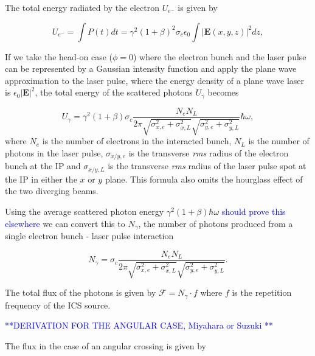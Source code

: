 \documentclass[../main.tex]{subfiles}
\begin{document}
The total energy radiated by the electron $U_{e^{-}}$ is given by

\begin{equation}
U_{e^{-}} = \int P\left(t\right)dt = \gamma^{2}\left(1+\beta\right)^{2}\sigma_{c}\epsilon_{0}\int\lvert\mathbf{E}\left(x,y,z\right)\rvert^{2}dz,
\label{eq:electron_radiated_energy}
\end{equation}

If we take the head-on case ($\phi=0$) where the electron bunch and the laser pulse can be represented by a Gaussian intensity function and apply the plane wave approximation to the laser pulse, where the energy density of a plane wave laser is $\epsilon_{0}\lvert\mathbf{E}\rvert^{2}$, the total energy of the scattered photons $U_{\gamma}$ becomes

\begin{equation}
U_{\gamma} = \gamma^{2}\left(1+\beta\right)\sigma_{c}\frac{N_{e}N_{L}}{2\pi\sqrt{\sigma_{x,e}^{2}+\sigma_{x,L}^2}\sqrt{\sigma_{y,e}^{2}+\sigma_{y,L}^{2}}}\hbar\omega,
\label{eq:total_interaction_energy}
\end{equation}
where $N_{e}$ is the number of electrons in the interacted bunch, $N_{L}$ is the number of photons in the laser pulse, $\sigma_{x/y,e}$ is the transverse \textit{rms} radius of the electron bunch at the IP and $\sigma_{x/y,L}$ is the transverse \textit{rms} radius of the laser pulse spot at the IP in either the $x$ or $y$ plane. This formula also omits the hourglass effect of the two diverging beams.

Using the average scattered photon energy $\gamma^{2}\left(1+\beta\right)\hbar\omega$ \textcolor{blue}{should prove this elsewhere} we can convert this to $N_{\gamma}$, the number of photons produced from a single electron bunch - laser pulse interaction

\begin{equation}
N_{\gamma} = \sigma_{c}\frac{N_{e}N_{L}}{2\pi\sqrt{\sigma_{x,e}^{2}+\sigma_{x,L}^2}\sqrt{\sigma_{y,e}^{2}+\sigma_{y,L}^{2}}}.
\label{eq:no_photon_headon}
\end{equation}

The total flux of the photons is given by $\mathcal{F} = N_{\gamma}\cdot f$ where $f$ is the repetition frequency of the ICS source.

\textcolor{blue}{**DERIVATION FOR THE ANGULAR CASE, Miyahara \cite{miyahara2008luminosity}or Suzuki \cite{suzuki1976general}**}

The flux in the case of an angular crossing is given by 
\end{document}
